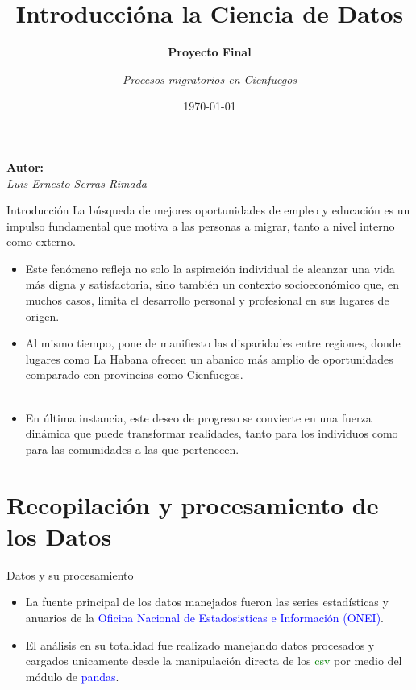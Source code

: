 \documentclass{beamer}
\title{\textbf{Introduccióna la Ciencia de Datos}}
\subtitle{\textbf{Proyecto Final}}
\author{\emph{Procesos migratorios en Cienfuegos}}
\date{\today}
\begin{document}
\begin{frame}
    \titlepage
    \begin{center} 
    \textbf{\large{Autor:}}\\
    \emph{Luis Ernesto Serras Rimada}
    \end{center}
\end{frame}


\begin{frame}{Introducción}
    La búsqueda de mejores oportunidades de empleo y educación es un impulso fundamental que motiva a las personas a migrar, tanto a nivel interno como externo. \\
\begin{itemize}
    \item Este fenómeno refleja no solo la aspiración individual de alcanzar una vida más digna y satisfactoria, sino también un contexto socioeconómico que, en muchos casos, limita el desarrollo personal y profesional en sus lugares de origen.\\
    \item Al mismo tiempo, pone de manifiesto las disparidades entre regiones, donde lugares como La Habana ofrecen un abanico más amplio de oportunidades comparado con provincias como Cienfuegos.\\\\
    \item En última instancia, este deseo de progreso se convierte en una fuerza dinámica que puede transformar realidades, tanto para los individuos como para las comunidades a las que pertenecen.
\end{itemize}
\end{frame}

\section{Recopilación y procesamiento de los Datos}
\begin{frame}
\begin{block}{Datos y su procesamiento}
    \begin{itemize}
        \item La fuente principal de los datos manejados fueron las series estadísticas y anuarios de la \textcolor{blue}{Oficina Nacional de Estadosisticas e Información (ONEI)}.
        \item El análisis en su totalidad fue realizado manejando datos procesados y cargados unicamente desde la manipulación directa de los \textcolor{green}{csv} por medio del módulo de \textcolor{blue}{pandas}.
    \end{itemize}
\end{block}
\end{frame}
\end{document}
